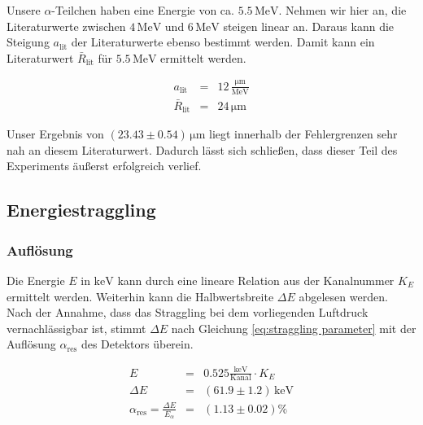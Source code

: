\documentclass[12pt,a4paper]{scrartcl}
\numberwithin{equation}{section} %
\begin{document}
Unsere $\alpha$-Teilchen haben eine Energie von ca. $5.5 \mathrm{\, MeV}$. Nehmen wir hier an, die Literaturwerte zwischen $4 \mathrm{\, MeV}$ und $6 \mathrm{\, MeV}$ steigen linear an. Daraus kann die Steigung $a_\mathrm{lit}$ der Literaturwerte ebenso bestimmt werden. Damit kann ein Literaturwert  $\bar R_\mathrm{lit}$ für $5.5 \mathrm{\, MeV}$ ermittelt werden.

\begin{eqnarray}
	a_\mathrm{lit} &=& 12 \mathrm{\, \frac{\mu m}{MeV}} \\
	\bar R_\mathrm{lit} &=& 24 \mathrm{\, \mu m}
\end{eqnarray}

Unser Ergebnis von $(23.43 \pm 0.54) \mathrm{\, \mu m}$ liegt innerhalb der Fehlergrenzen sehr nah an diesem Literaturwert. Dadurch lässt sich schließen, dass dieser Teil des Experiments äußerst erfolgreich verlief.

\hypertarget{energiestraggling-1}{%
	\subsection{Energiestraggling}\label{energiestraggling-1}}

\hypertarget{energiestraggling-aufloesung}{%
	\subsubsection{Auflösung}\label{energiestraggling-aufloesung}}
Die Energie $E$ in $\mathrm{keV}$ kann durch eine lineare Relation aus der Kanalnummer $K_E$ ermittelt werden. Weiterhin kann die Halbwertsbreite $\Delta E$ abgelesen werden. Nach der Annahme, dass das Straggling bei dem vorliegenden Luftdruck vernachlässigbar ist, stimmt $\Delta E$ nach Gleichung \eqref{eq:straggling parameter} mit der Auflösung $\alpha_\mathrm{res}$ des Detektors überein.

\begin{eqnarray}
	E &=& 0.525 \mathrm{\frac{keV}{Kanal }} \cdot K_E \label{eq:Kanal zu Energie}\\
	\Delta E &=& (61.9 \pm 1.2) \mathrm{\,keV} \label{eq:Halbwertsbreite} \\
	\alpha_\mathrm{res} = \frac{\Delta E}{E_\alpha} &=& (1.13 \pm 0.02) \%
\end{eqnarray}
\end{document}
